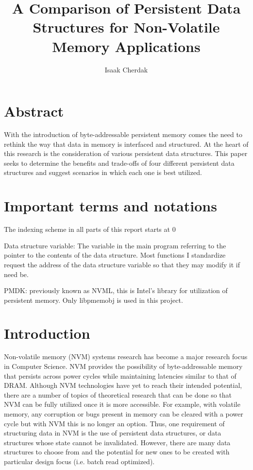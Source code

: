 \documentclass[twocolumn]{article}
\title{A Comparison of Persistent Data Structures for Non-Volatile Memory
Applications}
\author{Isaak Cherdak}
\begin{document}
\maketitle

\section*{Abstract}

With the introduction of byte-addressable persistent memory comes the need to
rethink the way that data in memory is interfaced and structured. At the heart
of this research is the consideration of various persistent data structures.
This paper seeks to determine the benefits and trade-offs of four different
persistent data structures and suggest scenarios in which each one is best
utilized.

\section*{Important terms and notations}


The indexing scheme in all parts of this report starts at 0

Data structure variable: The variable in the main program referring to the
pointer to the contents of the data structure. Most functions I standardize
request the address of the data structure variable so that they may modify it if
need be.

PMDK: previously known as NVML, this is Intel's library for utilization of
persistent memory. Only libpmemobj is used in this project.

\section{Introduction}

Non-volatile memory (NVM) systems research has become a major research focus in
Computer Science. NVM provides the possibility of byte-addressable memory that
persists across power cycles while maintaining latencies similar to that of
DRAM. Although NVM technologies have yet to reach their intended potential,
there are a number of topics of theoretical research that can be done so that
NVM can be fully utilized once it is more accessible. For example, with volatile
memory, any corruption or bugs present in memory can be cleared with a power
cycle but with NVM this is no longer an option. Thus, one requirement of
structuring data in NVM is the use of persistent data structures, or data
structures whose state cannot be invalidated. However, there are many data
structures to choose from and the potential for new ones to be created with
particular design focus (i.e. batch read optimized).
\end{document}
